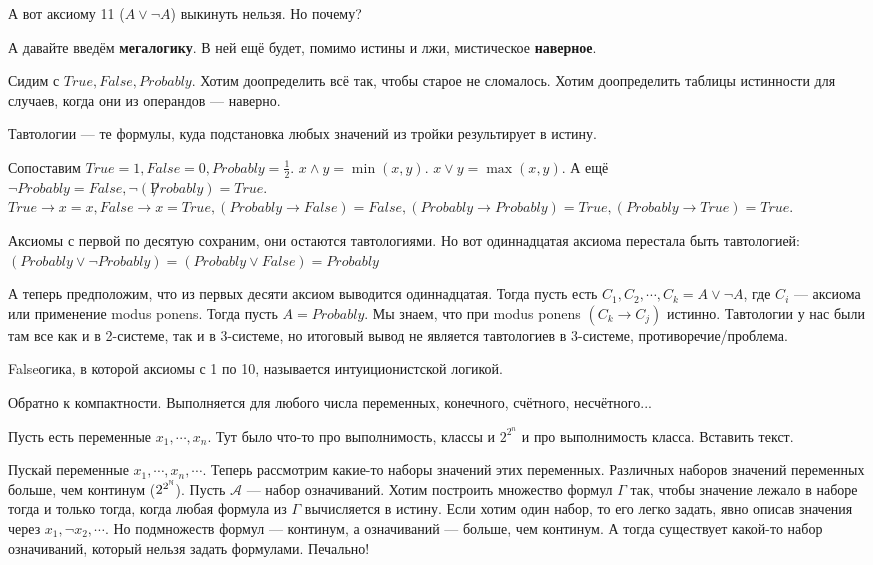 А вот аксиому 11 ($A \lor \lnot A$) выкинуть нельзя. Но почему?

А давайте введём \textbf{мегалогику}. В ней ещё будет, помимо истины и лжи, мистическое \textbf{наверное}. 

Сидим с $True, False, Probably$. Хотим доопределить всё так, чтобы старое не сломалось. Хотим доопределить таблицы истинности для случаев, когда они из операндов --- наверно.

Тавтологии --- те формулы, куда подстановка любых значений из тройки результирует в истину. 

Сопоставим $True = 1, False = 0, Probably = \frac12$. $x \land y = \min(x, y)$. $x \lor y = \max(x, y)$. А ещё $\lnot Probably = False, \lnot(\not Probably) = True$. $True \to x = x, False \to x = True, (Probably \to False) = False, (Probably \to Probably) = True, (Probably \to True) = True$.

Аксиомы с первой по десятую сохраним, они остаются тавтологиями. Но вот одиннадцатая аксиома перестала быть тавтологией: $(Probably \lor \lnot Probably) = (Probably \lor False) = Probably$

А теперь предположим, что из первых десяти аксиом выводится одиннадцатая. Тогда пусть есть $C_1, C_2, \cdots, C_k = A \lor \lnot A$, где $C_i$ --- аксиома или применение modus ponens. Тогда пусть $A = Probably$. Мы знаем, что при modus ponens $(C_k \to C_j)$ истинно. Тавтологии у нас были там все как и в 2-системе, так и в 3-системе, но итоговый вывод не является тавтологиев в 3-системе, противоречие/проблема. 

Falseогика, в которой аксиомы с 1 по 10, называется интуиционистской логикой.

Обратно к компактности. Выполняется для любого числа переменных, конечного, счётного, несчётного...

Пусть есть переменные $x_1, \cdots, x_n$. Тут было что-то про выполнимость, классы и $2^{2^n}$ и про выполнимость класса. Вставить текст.

Пускай переменные $x_1, \cdots, x_n, \cdots$. Теперь рассмотрим какие-то наборы значений этих переменных.  Различных наборов значений переменных больше, чем континум ($2^{2^{\mathbb{N}}}$). Пусть $\mathcal{A}$ --- набор означиваний. Хотим построить множество формул $\Gamma$ так, чтобы значение лежало в наборе тогда и только тогда, когда любая формула из $\Gamma$ вычисляется в истину. Если хотим один набор, то его легко задать, явно описав значения через $x_1, \lnot x_2, \cdots$. Но подмножеств формул --- континум, а означиваний --- больше, чем континум. А тогда существует какой-то набор означиваний, который нельзя задать формулами. Печально!



